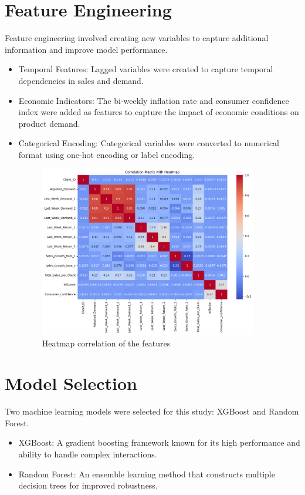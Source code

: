 \documentclass{article}
\begin{document}
\section{Feature Engineering}
Feature engineering involved creating new variables to capture additional information and improve model performance.
\begin{itemize}
    \item Temporal Features: Lagged variables were created to capture temporal dependencies in sales and demand.
    \item Economic Indicators: The bi-weekly inflation rate and consumer confidence index were added as features to capture the impact of economic conditions on product demand.
    \item Categorical Encoding: Categorical variables were converted to numerical format using one-hot encoding or label encoding.

\begin{figure}[H] 
    \begin{center}
    \centering
    \includegraphics[width=0.9\textwidth]{images/output.png}
    \caption{Heatmap correlation of the features}
    \end{center}
\end{figure}    

\end{itemize}

\section{Model Selection}

Two machine learning models were selected for this study: XGBoost and Random Forest.
\begin{itemize}
    \item XGBoost: A gradient boosting framework known for its high performance and ability to handle complex interactions.
    \item Random Forest: An ensemble learning method that constructs multiple decision trees for improved robustness.
\end{itemize}
\end{document}

